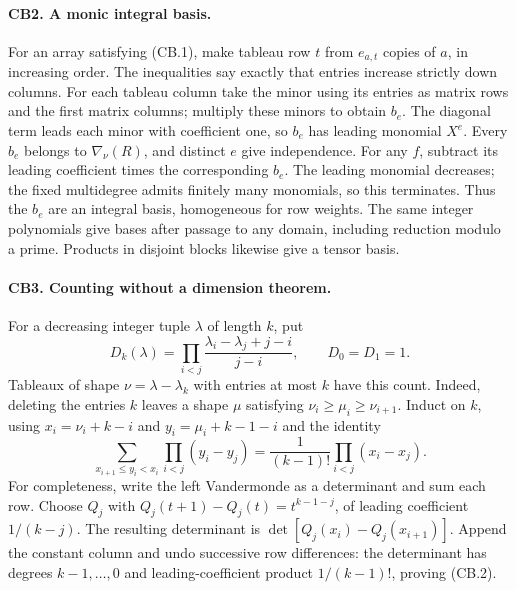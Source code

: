 \documentclass[11pt,a4paper]{article}
\numberwithin{equation}{section}
\theoremstyle{remark}\newtheorem{remark}[theorem]{Remark}
\begin{document}
\paragraph{CB2. A monic integral basis.}
For an array satisfying (CB.1), make tableau row $t$ from $e_{a,t}$ copies of $a$, in increasing order.
The inequalities say exactly that entries increase strictly down columns.
For each tableau column take the minor using its entries as matrix rows and the first matrix columns; multiply these minors to obtain $b_e$.
The diagonal term leads each minor with coefficient one, so $b_e$ has leading monomial $X^e$.
Every $b_e$ belongs to $\nabla_\nu(R)$, and distinct $e$ give independence.
For any $f$, subtract its leading coefficient times the corresponding $b_e$.
The leading monomial decreases; the fixed multidegree admits finitely many monomials, so this terminates.
Thus the $b_e$ are an integral basis, homogeneous for row weights.
The same integer polynomials give bases after passage to any domain, including reduction modulo a prime.
Products in disjoint blocks likewise give a tensor basis.

\paragraph{CB3. Counting without a dimension theorem.}
For a decreasing integer tuple $\lambda$ of length $k$, put
\[
 D_k(\lambda)=\prod_{i<j}\frac{\lambda_i-\lambda_j+j-i}{j-i},\qquad D_0=D_1=1.
\]
Tableaux of shape $\nu=\lambda-\lambda_k$ with entries at most $k$ have this count.
Indeed, deleting the entries $k$ leaves a shape $\mu$ satisfying
$\nu_i\ge\mu_i\ge\nu_{i+1}$.
Induct on $k$, using $x_i=\nu_i+k-i$ and $y_i=\mu_i+k-1-i$ and the identity
\[
 \sum_{x_{i+1}\le y_i<x_i}\prod_{i<j}(y_i-y_j)
 =\frac{1}{(k-1)!}\prod_{i<j}(x_i-x_j). \tag{CB.2}
\]
For completeness, write the left Vandermonde as a determinant and sum each row.
Choose $Q_j$ with $Q_j(t+1)-Q_j(t)=t^{k-1-j}$, of leading coefficient $1/(k-j)$.
The resulting determinant is $\det[Q_j(x_i)-Q_j(x_{i+1})]$.
Append the constant column and undo successive row differences: the determinant has degrees $k-1,\ldots,0$ and leading-coefficient product $1/(k-1)!$, proving (CB.2).
\end{document}
